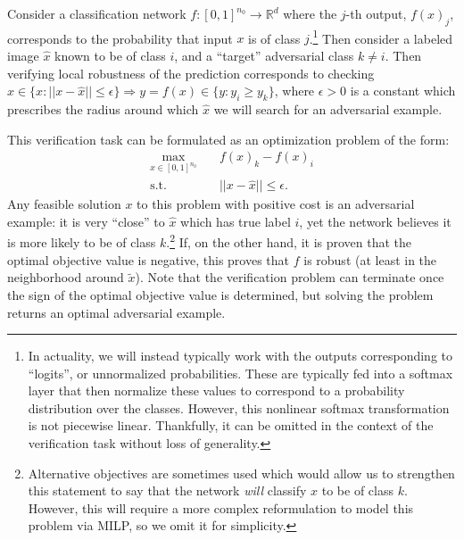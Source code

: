 \begin{example}
Consider a classification network $f : [0,1]^{n_0} \to \mathbb{R}^d$ where the $j$-th output, $f(x)_j$, corresponds to the probability that input $x$ is of class $j$.\footnote{In actuality, we will instead typically work with the outputs corresponding to ``logits'', or unnormalized probabilities. These are typically fed into a softmax layer that then normalize these values to correspond to a probability distribution over the classes. However, this nonlinear softmax transformation is not piecewise linear. Thankfully, it can be omitted in the context of the verification task without loss of generality.} Then consider a labeled image $\hat{x}$ known to be of class $i$, and a ``target'' adversarial class $k \neq i$. 
Then verifying local robustness of the prediction corresponds to checking $x \in \{ x: ||x-\hat{x}|| \leq \epsilon \} \Rightarrow y=f(x) \in \{ y: y_i \geq y_k \}$, where $\epsilon > 0$ is a constant which prescribes the radius around which $\hat{x}$ we will search for an adversarial example. 

This verification task can be formulated as an optimization problem of the form:
\begin{equation} \label{eq:verification}
\begin{aligned} 
    \max_{x \in [0,1]^{n_0}} \quad& f(x)_k - f(x)_i \\
    \text{s.t.}& ||x - \hat{x}|| \leq \epsilon.
\end{aligned}
\end{equation}Any feasible solution $x$ to this problem with positive cost is an adversarial example: it is very ``close'' to $\hat{x}$ which has true label $i$, yet the network believes it is more likely to be of class $k$.\footnote{Alternative objectives are sometimes used which would allow us to strengthen this statement to say that the network \emph{will} classify $x$ to be of class $k$. However, this will require a more complex reformulation to model this problem via MILP, so we omit it for simplicity.} If, on the other hand, it is proven that the optimal objective value is negative, this proves that $f$ is robust (at least in the neighborhood around $\tilde{x}$). 
Note that the verification problem can terminate once the sign of the optimal objective value is determined, but solving the problem returns an optimal adversarial example. 
\end{example}


